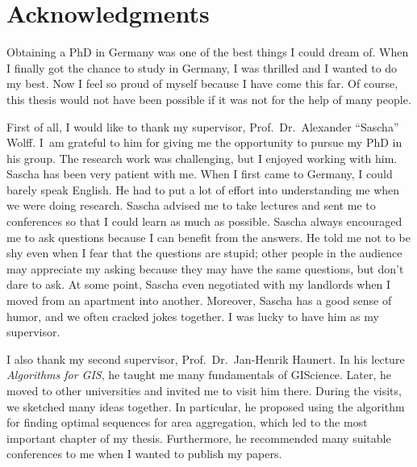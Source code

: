 {\setlength{\parskip}{0ex}

\section{Acknowledgments}

Obtaining a PhD in Germany was 
one of the best things I could dream of.
When I finally got the chance to study in Germany,
I was thrilled and I wanted to do my best.
Now I feel so proud of myself because I have come this far.
Of course, this thesis would not have been possible
if it was not for the help of many people.

First of all, I would like to thank my supervisor, 
Prof.\ Dr.\ Alexander ``Sascha'' Wolff.
I~am grateful to him for giving me 
the opportunity to pursue my PhD in his group.
The research work was challenging,
but I enjoyed working with him.
Sascha has been very patient with me.
When I first came to Germany, I could barely speak English.
He had to put a lot of effort into understanding me
when we were doing research.
Sascha advised me to take lectures and sent me to conferences
so that I could learn as much as possible.
Sascha always encouraged me to ask questions
because I can benefit from the answers.
He told me not to be shy even when 
I fear that the questions are stupid;
other people in the audience may appreciate my asking
because they may have the same questions,
but don't dare to ask.
At some point,
Sascha even negotiated with my landlords 
when I moved from an apartment into another.
Moreover, Sascha has a good sense of humor, 
and we often cracked jokes together.
I was lucky to have him as my supervisor.

I also thank my second supervisor, 
Prof.\ Dr.\ Jan-Henrik Haunert.  
In his lecture \emph{Algorithms for GIS}, 
he taught me many fundamentals of GIScience.  
Later, he moved to other universities 
and invited me to visit him there.
During the visits, we sketched many ideas together.
In particular, he proposed %
using the \Astar algorithm 
for finding optimal sequences for area aggregation,
which led to the most important chapter of my thesis.
Furthermore, he recommended many suitable conferences to me
when I wanted to publish my papers.

}
